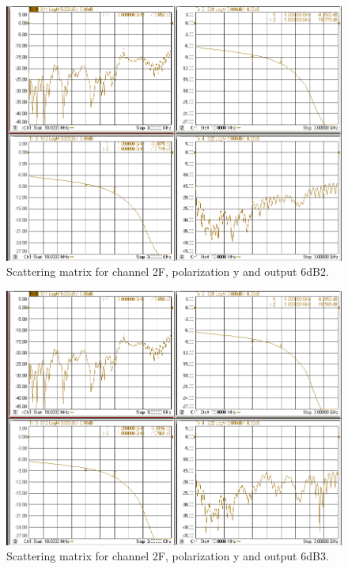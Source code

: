 \documentclass[12pt,a4paper,oneside]{article}
\begin{document}
\begin{figure}[H]
\centering
\includegraphics[width=0.9\linewidth]{VNA_results/2Fy_6dB2.png}
\caption{Scattering matrix for channel 2F, polarization y and output 6dB2.}
\label{fig:2Fy_6dB2}
\end{figure}


\begin{figure}[H]
\centering
\includegraphics[width=0.9\linewidth]{VNA_results/2Fy_6dB3.png}
\caption{Scattering matrix for channel 2F, polarization y and output 6dB3.}
\label{fig:2Fy_6dB3}
\end{figure}
\end{document}
